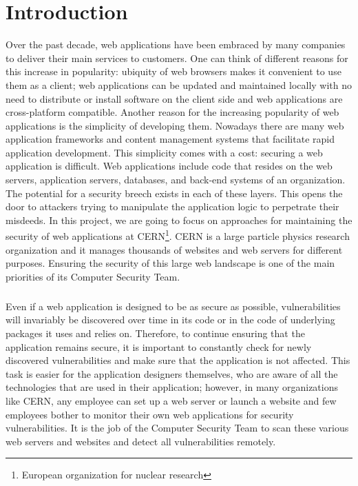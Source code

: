 \chapter{Introduction}
\label{introduction}
\thispagestyle{empty}
Over the past decade, web applications have been embraced by many companies to deliver their main services to customers. One can think of different reasons for this increase in popularity: ubiquity of web browsers makes it convenient to use them as a client; web applications can be updated and maintained locally with no need to distribute or install software on the client side and web applications are cross-platform compatible.
Another reason for the increasing popularity of web applications is the simplicity of developing them. Nowadays there are many web application frameworks and content management systems that facilitate rapid application development. This simplicity comes with a cost: securing a web application is difficult. Web applications include code that resides on the web servers, application servers, databases, and back-end systems of an organization. The potential for a security breech exists in each of these layers. This opens the door to attackers trying to manipulate the application logic to perpetrate their misdeeds\cite{secure_web}. In this project, we are going to focus on approaches for maintaining the security of web applications at CERN\footnote{European organization for nuclear research}. CERN is a large particle physics research organization and it manages thousands of websites and web servers for different purposes. Ensuring the security of this large web landscape is one of the main priorities of its Computer Security Team.

\paragraph{}
Even if a web application is designed to be as secure as possible, vulnerabilities will invariably be discovered over time in its code or in the code of underlying packages it uses and relies on. Therefore, to continue ensuring that the application remains secure, it is important to constantly check for newly discovered vulnerabilities and make sure that the application is not affected. This task is easier for the application designers themselves, who are aware of all the technologies that are used in their application; however, in many organizations like CERN, any employee can set up a web server or launch a website and few employees bother to monitor their own web applications for security vulnerabilities. It is the job of the Computer Security Team to scan these various web servers and websites and detect all vulnerabilities remotely.
